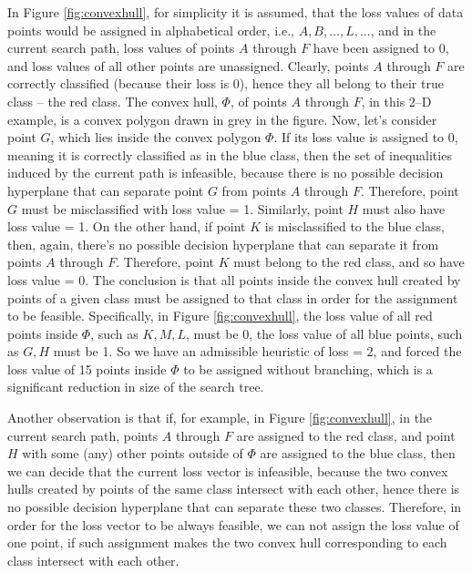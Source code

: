 In Figure \ref{fig:convexhull}, for simplicity it is assumed, that the loss values of data points would be assigned in alphabetical order, i.e., $A, B, \dots, L, \dots $, and in the current search path, loss values of points $A$ through $F$ have been assigned to 0, and loss values of all other points are unassigned. Clearly, points $A$ through $F$ are correctly classified (because their loss is 0), hence they all belong to their true class -- the red class. The convex hull, $\Phi$, of points $A$ through $F$, in this 2--D example, is a convex polygon drawn in grey in the figure. Now, let's consider point $G$, which lies inside the convex polygon $\Phi$. If its loss value is assigned to 0, meaning it is correctly classified as in the blue class, then the set of inequalities induced by the current path is infeasible, because there is no possible decision hyperplane that can separate point $G$ from points $A$ through $F$. Therefore, point $G$ must be misclassified with loss value = 1. Similarly, point $H$ must also have loss value = 1. On the other hand, if point $K$ is misclassified to the blue class, then, again, there's no possible decision hyperplane that can separate it from points $A$ through $F$. Therefore, point $K$ must belong to the red class, and so have loss value = 0. The conclusion is that all points inside the convex hull created by points of a given class must be assigned to that class in order for the assignment to be feasible. Specifically, in Figure \ref{fig:convexhull}, the loss value of all red points inside $\Phi$, such as $K,M,L$, must be 0, the loss value of all blue points, such as $G, H$ must be 1. So we have an admissible heuristic of loss = 2, and forced the loss value of 15 points inside $\Phi$ to be assigned without branching, which is a significant reduction in size of the search tree. 

Another observation is that if, for example, in Figure \ref{fig:convexhull}, in the current search path, points $A$ through $F$ are assigned to the red class, and point $H$ with some (any) other points outside of $\Phi$ are assigned to the blue class, then we can decide that the current loss vector is infeasible, because the two convex hulls created by points of the same class intersect with each other, hence there is no possible decision hyperplane that can separate these two classes. Therefore, in order for the loss vector to be always feasible, we can not assign the loss value of one point, if such assignment makes the two convex hull corresponding to each class intersect with each other. 

